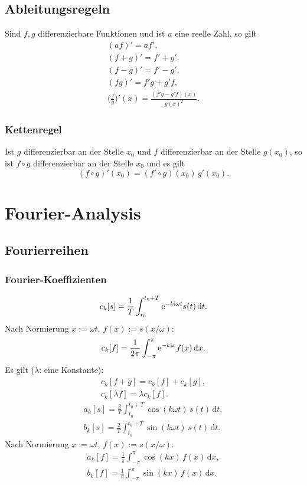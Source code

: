 \subsection{Ableitungsregeln}
Sind $f,g$ differenzierbare Funktionen und ist $a$ eine reelle Zahl,
so gilt
\begin{gather}
(af)' = af',\\
(f+g)' = f'+g',\\
(f-g)' = f'-g',\\
(fg)' = f'g+g'f,\\
\Big(\frac{f}{g}\Big)'(x) = \frac{(f'g-g'f)(x)}{g(x)^2}.
\end{gather}
\subsubsection{Kettenregel}
Ist $g$ differenzierbar an der Stelle $x_0$ und
$f$ differenzierbar an der Stelle $g(x_0)$, so ist $f\circ g$
differenzierbar an der Stelle $x_0$ und es gilt
\begin{equation}
(f\circ g)'(x_0) = (f'\circ g)(x_0)\, g'(x_0).
\end{equation}

\section{Fourier-Analysis}
\subsection{Fourierreihen}
\subsubsection{Fourier-Koeffizienten}
\begin{equation}
c_k[s] = \frac{1}{T}\int_{t_0}^{t_0+T} \mathrm e^{-k\mathrm i\omega t}s(t)\,\mathrm dt.
\end{equation}
Nach Normierung $x:=\omega t$, $f(x):=s(x/\omega)$:
\begin{equation}
c_k[f] = \frac{1}{2\pi}\int_{-\pi}^{\pi} \mathrm e^{-k\mathrm i x}f(x)\,\mathrm dx.
\end{equation}
Es gilt ($\lambda$: eine Konstante):
\begin{gather}
c_k[f+g] = c_k[f]+c_k[g],\\
c_k[\lambda f] = \lambda c_k[f].
\end{gather}
\begin{gather}
a_k[s] = \frac{2}{T}\int_{t_0}^{t_0+T} \cos(k\omega t)\,s(t)\,\mathrm dt,\\
b_k[s] = \frac{2}{T}\int_{t_0}^{t_0+T} \sin(k\omega t)\,s(t)\,\mathrm dt.
\end{gather}
Nach Normierung $x:=\omega t$, $f(x):=s(x/\omega)$:
\begin{gather}
a_k[f] = \frac{1}{\pi}\int_{-\pi}^{\pi} \cos(kx)\,f(x)\,\mathrm dx,\\
b_k[f] = \frac{1}{\pi}\int_{-\pi}^{\pi} \sin(kx)\,f(x)\,\mathrm dx.
\end{gather}

